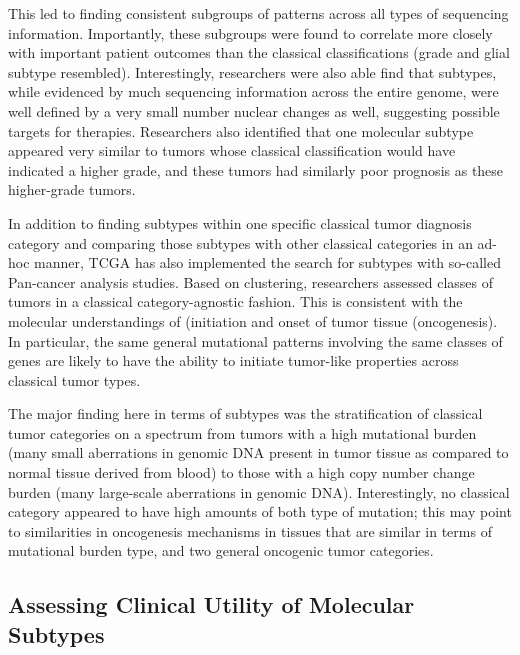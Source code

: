         This led to finding consistent subgroups of patterns across
        all types of  sequencing information. Importantly, these
        subgroups were found to correlate more closely with important
        patient outcomes than the classical classifications (grade and
        glial subtype resembled). Interestingly, researchers were also
        able find that subtypes, while evidenced by much sequencing
        information across the entire genome, were well defined by a
        very small number nuclear changes as well, suggesting possible
        targets for therapies. Researchers also identified that one
        molecular subtype appeared very similar to tumors whose
        classical classification would have indicated a higher grade,
        and these tumors had similarly poor prognosis as these
        higher-grade tumors.


        

        In addition to finding subtypes within one specific classical tumor
        diagnosis category and comparing those subtypes with other classical
        categories in an ad-hoc manner, TCGA has also implemented the search
        for subtypes with so-called Pan-cancer analysis\cite{weinstein_cancer_2013} studies. Based on
        clustering, researchers assessed classes of tumors in a classical
        category-agnostic fashion. This is consistent with the molecular
        understandings of (initiation and onset of tumor tissue
        (oncogenesis). In particular, the same general mutational patterns
        involving the same classes of genes are likely to have the ability to
        initiate tumor-like properties across classical tumor types.


        The major finding here in terms of subtypes was the stratification of
        classical tumor categories on a spectrum from tumors with a high
        mutational burden (many small aberrations in genomic DNA present in
        tumor tissue as compared to normal tissue derived from blood) to those
        with a high copy number change burden (many large-scale aberrations in
        genomic DNA). Interestingly, no classical category appeared to have
        high amounts of both type of mutation; this may point to similarities
        in oncogenesis mechanisms in tissues that are similar in terms of
        mutational burden type, and two general oncogenic tumor
        categories.
        
        \subsection{Assessing Clinical Utility of Molecular Subtypes}

